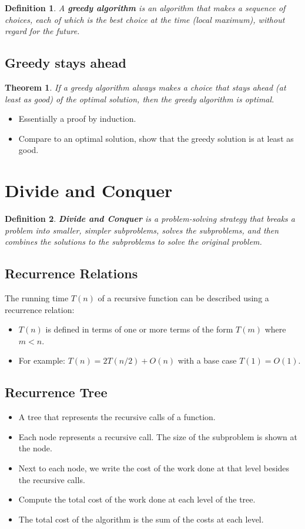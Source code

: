 \documentclass[11pt,fleqn]{article}
\newtheorem*{theorem}{Theorem}
\newtheorem*{definition}{Definition}
\begin{document}
\begin{definition}
    A \textbf{greedy algorithm} is an algorithm that makes a sequence of choices, each of which is the best choice at the time (local maximum), without regard for the future.
\end{definition}
\subsection{Greedy stays ahead}
\begin{theorem}
    If a greedy algorithm always makes a choice that stays ahead (at least as good) of the optimal solution, then the greedy algorithm is optimal.
\end{theorem}
\begin{itemize}
    \item Essentially a proof by induction.
    \item Compare to an optimal solution, show that the greedy solution is at least as good.
\end{itemize}

\section{Divide and Conquer}

\begin{definition}
    \textbf{Divide and Conquer} is a problem-solving strategy that breaks a problem into smaller, simpler subproblems, solves the subproblems, and then combines the solutions to the subproblems to solve the original problem.
\end{definition}

\subsection{Recurrence Relations}
The running time $T(n)$ of a recursive function can be described using a recurrence relation:\begin{itemize}
    \item $T(n)$ is defined in terms of one or more terms of the form $T(m)$ where $m < n$.
    \item For example: $T(n) = 2T(n/2) + O(n)$ with a base case $T(1) = O(1)$.
\end{itemize}

\subsection{Recurrence Tree}
\begin{itemize}
    \item A tree that represents the recursive calls of a function.
    \item Each node represents a recursive call. The size of the subproblem is shown at the node.
    \item Next to each node, we write the cost of the work done at that level besides the recursive calls.
    \item Compute the total cost of the work done at each level of the tree.
    \item The total cost of the algorithm is the sum of the costs at each level.
\end{itemize}
\end{document}

